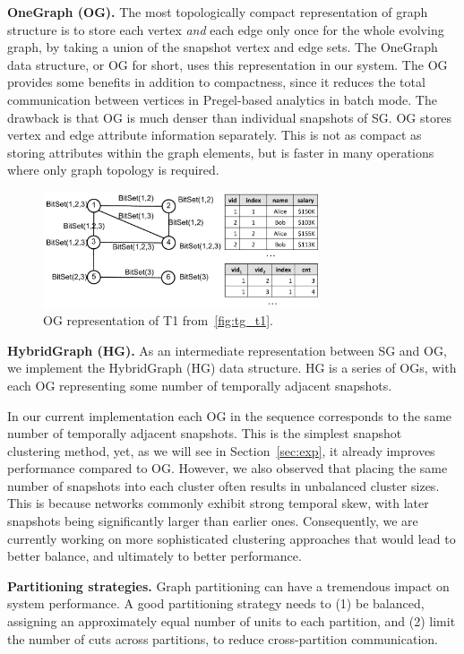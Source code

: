 {\bf OneGraph (OG).}  The most topologically compact representation of
graph structure is to store each vertex {\em and} each edge only once
for the whole evolving graph, by taking a union of the snapshot vertex
and edge sets.  The OneGraph data structure, or OG for short, uses
this representation in our system.
%
The OG provides some benefits in addition to compactness, since it
reduces the total communication between vertices in Pregel-based
analytics in batch mode.  The drawback is that OG is much denser than
individual snapshots of SG.  OG stores vertex and edge attribute
information separately.  This is not as compact as storing attributes
within the graph elements, but is faster in many operations where only
graph topology is required.

\begin{figure}[t!]
\includegraphics[width=3.2in]{figs/ogc.pdf}
\caption{OG representation of T1 from~\ref{fig:tg_t1}.}
\label{fig:ogc}
\end{figure}

{\bf HybridGraph (HG).} As an intermediate representation between SG
and OG, we implement the HybridGraph (HG) data structure.  HG is a
series of OGs, with each OG representing some number of temporally
adjacent snapshots.

In our current implementation each OG in the sequence corresponds to
the same number of temporally adjacent snapshots.  This is the
simplest snapshot clustering method, yet, as we will see in
Section~\ref{sec:exp}, it already improves performance
compared to OG.  However, we also observed that placing the same
number of snapshots into each cluster often results in unbalanced
cluster sizes.  This is because networks commonly exhibit strong
temporal skew, with later snapshots being significantly larger than
earlier ones.  Consequently, we are currently working on more
sophisticated clustering approaches that would lead to better balance,
and ultimately to better performance.

{\bf Partitioning strategies.}  Graph partitioning can have a
tremendous impact on system performance.  A good partitioning strategy
needs to (1) be balanced, assigning an approximately equal number of
units to each partition, and (2) limit the number of cuts across
partitions, to reduce cross-partition communication.


